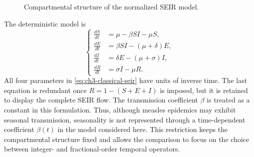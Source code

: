 \documentclass[00-main.tex]{subfiles}
\begin{document}
\begin{figure}[H]
\centering
{}
\caption{Compartmental structure of the normalized SEIR model.}
\label{fig:ch3-seir-flow}
\end{figure}

The deterministic model is
\begin{equation}
\label{eq:ch3-classical-seir}
\left\{
\begin{aligned}
\frac{dS}{dt} &= \mu-\beta SI-\mu S,\\[3pt]
\frac{dE}{dt} &= \beta SI-(\mu+\delta)E,\\[3pt]
\frac{dI}{dt} &= \delta E-(\mu+\sigma)I,\\[3pt]
\frac{dR}{dt} &= \sigma I-\mu R.
\end{aligned}
\right.
\end{equation}
All four parameters in \eqref{eq:ch3-classical-seir} have units of inverse time.
The last equation is redundant once $R=1-(S+E+I)$ is imposed, but it is retained to display the complete SEIR flow.
The transmission coefficient $\beta$ is treated as a constant in this formulation.
Thus, although measles epidemics may exhibit seasonal transmission, seasonality is not represented through a time-dependent coefficient $\beta(t)$ in the model considered here.
This restriction keeps the compartmental structure fixed and allows the comparison to focus on the choice between integer- and fractional-order temporal operators.
\end{document}
